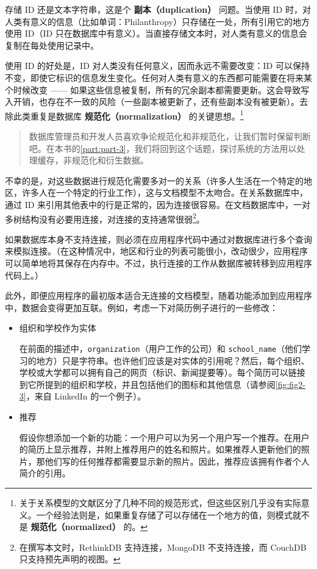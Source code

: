 存储 ID 还是文本字符串，这是个 \textbf{副本（duplication）} 问题。当使用 ID 时，对人类有意义的信息（比如单词：Philanthropy）只存储在一处，所有引用它的地方使用 ID（ID 只在数据库中有意义）。当直接存储文本时，对人类有意义的信息会复制在每处使用记录中。

使用 ID 的好处是，ID 对人类没有任何意义，因而永远不需要改变：ID 可以保持不变，即使它标识的信息发生变化。任何对人类有意义的东西都可能需要在将来某个时候改变 —— 如果这些信息被复制，所有的冗余副本都需要更新。这会导致写入开销，也存在不一致的风险（一些副本被更新了，还有些副本没有被更新）。去除此类重复是数据库 \textbf{规范化（normalization）} 的关键思想。\footnote{关于关系模型的文献区分了几种不同的规范形式，但这些区别几乎没有实际意义。一个经验法则是，如果重复存储了可以存储在一个地方的值，则模式就不是 \textbf{规范化（normalized）} 的。}

\begin{quote}
    数据库管理员和开发人员喜欢争论规范化和非规范化，让我们暂时保留判断吧。在本书的\autoref{part:part-3}，我们将回到这个话题，探讨系统的方法用以处理缓存，非规范化和衍生数据。
\end{quote}

不幸的是，对这些数据进行规范化需要多对一的关系（许多人生活在一个特定的地区，许多人在一个特定的行业工作），这与文档模型不太吻合。在关系数据库中，通过 ID 来引用其他表中的行是正常的，因为连接很容易。在文档数据库中，一对多树结构没有必要用连接，对连接的支持通常很弱\footnote{在撰写本文时，RethinkDB 支持连接，MongoDB 不支持连接，而 CouchDB 只支持预先声明的视图。}。

如果数据库本身不支持连接，则必须在应用程序代码中通过对数据库进行多个查询来模拟连接。（在这种情况中，地区和行业的列表可能很小，改动很少，应用程序可以简单地将其保存在内存中。不过，执行连接的工作从数据库被转移到应用程序代码上。）

此外，即便应用程序的最初版本适合无连接的文档模型，随着功能添加到应用程序中，数据会变得更加互联。例如，考虑一下对简历例子进行的一些修改：

\begin{itemize}
    \item 组织和学校作为实体
    
    在前面的描述中，\texttt{organization}（用户工作的公司）和 \texttt{school\_name}（他们学习的地方）只是字符串。也许他们应该是对实体的引用呢？然后，每个组织、学校或大学都可以拥有自己的网页（标识、新闻提要等）。每个简历可以链接到它所提到的组织和学校，并且包括他们的图标和其他信息（请参阅\autoref{fig:fig2-3}，来自 LinkedIn 的一个例子）。
    
    \item 推荐
    
    假设你想添加一个新的功能：一个用户可以为另一个用户写一个推荐。在用户的简历上显示推荐，并附上推荐用户的姓名和照片。如果推荐人更新他们的照片，那他们写的任何推荐都需要显示新的照片。因此，推荐应该拥有作者个人简介的引用。
\end{itemize}

